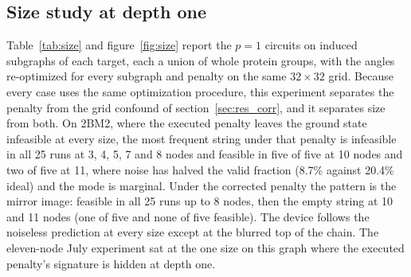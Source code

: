 \documentclass{iopjournal}
\begin{document}
\subsection{Size study at depth one}
\label{sec:res_size}
Table~\ref{tab:size} and figure~\ref{fig:size} report the $p=1$ circuits on induced subgraphs of each target, each a union of whole protein groups, with the angles re-optimized for every subgraph and penalty on the same $32\times32$ grid. Because every case uses the same optimization procedure, this experiment separates the penalty from the grid confound of section~\ref{sec:res_corr}, and it separates size from both. On 2BM2, where the executed penalty leaves the ground state infeasible at every size, the most frequent string under that penalty is infeasible in all 25 runs at 3, 4, 5, 7 and 8 nodes and feasible in five of five at 10 nodes and two of five at 11, where noise has halved the valid fraction (8.7\% against 20.4\% ideal) and the mode is marginal. Under the corrected penalty the pattern is the mirror image: feasible in all 25 runs up to 8 nodes, then the empty string at 10 and 11 nodes (one of five and none of five feasible). The device follows the noiseless prediction at every size except at the blurred top of the chain. The eleven-node July experiment sat at the one size on this graph where the executed penalty's signature is hidden at depth one.
\end{document}
